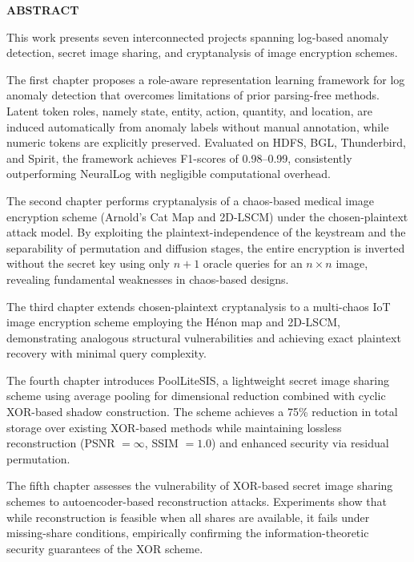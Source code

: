 \begin{center}
\textbf{{\Large ABSTRACT}}\\
\begin{center}
\justifying

This work presents seven interconnected projects spanning log-based anomaly detection, secret image sharing, and cryptanalysis of image encryption schemes.

The first chapter proposes a role-aware representation learning framework for log anomaly detection that overcomes limitations of prior parsing-free methods. Latent token roles, namely state, entity, action, quantity, and location, are induced automatically from anomaly labels without manual annotation, while numeric tokens are explicitly preserved. Evaluated on HDFS, BGL, Thunderbird, and Spirit, the framework achieves F1-scores of 0.98--0.99, consistently outperforming NeuralLog with negligible computational overhead.

The second chapter performs cryptanalysis of a chaos-based medical image encryption scheme (Arnold's Cat Map and 2D-LSCM) under the chosen-plaintext attack model. By exploiting the plaintext-independence of the keystream and the separability of permutation and diffusion stages, the entire encryption is inverted without the secret key using only $n+1$ oracle queries for an $n \times n$ image, revealing fundamental weaknesses in chaos-based designs.

The third chapter extends chosen-plaintext cryptanalysis to a multi-chaos IoT image encryption scheme employing the Hénon map and 2D-LSCM, demonstrating analogous structural vulnerabilities and achieving exact plaintext recovery with minimal query complexity.

The fourth chapter introduces PoolLiteSIS, a lightweight secret image sharing scheme using average pooling for dimensional reduction combined with cyclic XOR-based shadow construction. The scheme achieves a 75\% reduction in total storage over existing XOR-based methods while maintaining lossless reconstruction (PSNR $= \infty$, SSIM $= 1.0$) and enhanced security via residual permutation.

The fifth chapter assesses the vulnerability of XOR-based secret image sharing schemes to autoencoder-based reconstruction attacks. Experiments show that while reconstruction is feasible when all shares are available, it fails under missing-share conditions, empirically confirming the information-theoretic security guarantees of the XOR scheme.


\end{center}
\end{center}
